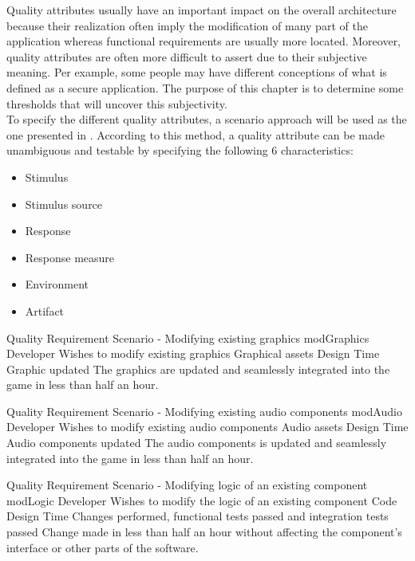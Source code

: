 
Quality attributes usually have an important impact on the overall architecture because their realization often imply the modification of many part of the application whereas functional requirements are usually more located. Moreover, quality attributes are often more difficult to assert due to their subjective meaning. Per example, some people may have different conceptions of what is defined as a secure application. The purpose of this chapter is to determine some thresholds that will uncover this subjectivity. \\

To specify the different quality attributes, a scenario approach will be used as the one presented in \cite[Chapter 4, p.68-69]{bass2013}. According to this method, a quality attribute can be made unambiguous and testable by specifying the following 6 characteristics:
\begin{itemize}
  \item Stimulus
  \item Stimulus source
  \item Response
  \item Response measure
  \item Environment
  \item Artifact
\end{itemize}


{Quality Requirement Scenario - Modifying existing graphics}
{modGraphics}
{Developer}
{Wishes to modify existing graphics}
{Graphical assets}
{Design Time}
{Graphic updated}
{The graphics are updated and seamlessly integrated into the game in less than half an hour.}

{Quality Requirement Scenario - Modifying existing audio components}
{modAudio}
{Developer}
{Wishes to modify existing audio components}
{Audio assets}
{Design Time}
{Audio components updated}
{The audio components is updated and seamlessly integrated into the game in less than half an hour.}

{Quality Requirement Scenario - Modifying logic of an existing component}
{modLogic}
{Developer}
{Wishes to modify the logic of an existing component}
{Code}
{Design Time}
{Changes performed, functional tests passed and integration tests passed}
{Change made in less than half an hour without affecting the component’s interface or other parts of the software.}

